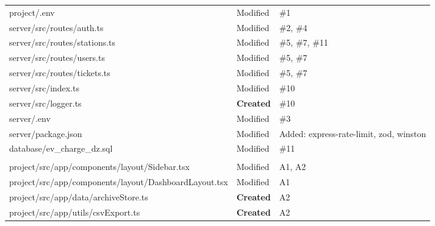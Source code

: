 \documentclass[12pt,a4paper]{report}
\begin{document}
\begin{longtable}{
			>{\ttfamily\small}p{7.8cm}
			p{2.2cm}
			p{3.2cm}
		}
		project/.env &
		\textcolor{highorange}{Modified} & \#1 \\
		
		\rowcolor{rowalt}
		server/src/routes/auth.ts &
		\textcolor{highorange}{Modified} & \#2, \#4 \\
		
		server/src/routes/stations.ts &
		\textcolor{highorange}{Modified} & \#5, \#7, \#11 \\
		
		\rowcolor{rowalt}
		server/src/routes/users.ts &
		\textcolor{highorange}{Modified} & \#5, \#7 \\
		
		server/src/routes/tickets.ts &
		\textcolor{highorange}{Modified} & \#5, \#7 \\
		
		\rowcolor{rowalt}
		server/src/index.ts &
		\textcolor{highorange}{Modified} & \#10 \\
		
		server/src/logger.ts &
		\textcolor{greenfg}{\textbf{Created}} & \#10 \\
		
		\rowcolor{rowalt}
		server/.env &
		\textcolor{highorange}{Modified} & \#3 \\
		
		server/package.json &
		\textcolor{highorange}{Modified} &
		\small{Added: express-rate-limit, zod, winston} \\
		
		\rowcolor{rowalt}
		database/ev\_charge\_dz.sql &
		\textcolor{highorange}{Modified} & \#11 \\

		\multicolumn{3}{l}{\cellcolor{lightblue}\textbf{\color{brandblue}
		Feature Additions --- May 2026}} \\

		\rowcolor{rowalt}
		project/src/app/components/layout/Sidebar.tsx &
		\textcolor{highorange}{Modified} & A1, A2 \\

		project/src/app/components/layout/DashboardLayout.tsx &
		\textcolor{highorange}{Modified} & A1 \\

		\rowcolor{rowalt}
		project/src/app/data/archiveStore.ts &
		\textcolor{greenfg}{\textbf{Created}} & A2 \\

		project/src/app/utils/csvExport.ts &
		\textcolor{greenfg}{\textbf{Created}} & A2 \\


\end{longtable}
\end{document}
